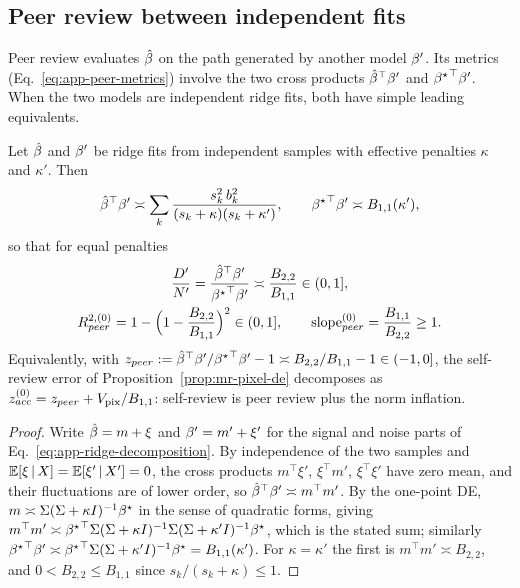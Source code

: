 \subsection{Peer review between independent fits}
\label{sec:app-peer-review}

Peer review evaluates $\hat{\beta}$ on the path generated by another model
${\beta^{\prime}}$.  Its metrics (Eq.~\ref{eq:app-peer-metrics}) involve the two
cross products ${\hat{\beta}}^\top{\beta^{\prime}}$ and ${{\beta^{\star}}}^\top{\beta^{\prime}}$.  When the
two models are independent ridge fits, both have simple leading
equivalents.

\begin{prop}
\label{prop:app-peer}
Let $\hat{\beta}$ and ${\beta^{\prime}}$ be ridge fits from independent samples with
effective penalties $\kappa$ and $\kappa'$.  Then
\begin{equation}
{\hat{\beta}}^\top{\beta^{\prime}}\asymp\sum_k\frac{s_k^2\,b_k^2}{(s_k+\kappa)(s_k+\kappa')},\qquad
{{\beta^{\star}}}^\top{\beta^{\prime}}\asymp B_{1,1}(\kappa'),
\end{equation}
so that for equal penalties
\begin{equation}
\begin{gathered}
\frac{D^\prime}{N^\prime}=\frac{{\hat{\beta}}^\top{\beta^{\prime}}}{{{\beta^{\star}}}^\top{\beta^{\prime}}}\asymp\frac{B_{2,2}}{B_{1,1}}\in(0,1],\\
R^{2,(0)}_{peer}=1-\Big(1-\frac{B_{2,2}}{B_{1,1}}\Big)^2\in(0,1],
\qquad
\mathrm{slope}^{(0)}_{peer}=\frac{B_{1,1}}{B_{2,2}}\ge1 .
\end{gathered}
\label{eq:app-peer-de}
\end{equation}
Equivalently, with $z_{peer}:={\hat{\beta}}^\top{\beta^{\prime}}/{{\beta^{\star}}}^\top{\beta^{\prime}}-1\asymp B_{2,2}/B_{1,1}-1\in(-1,0]$, the self-review error of Proposition~\ref{prop:mr-pixel-de} decomposes as $z^{(0)}_{acc}=z_{peer}+V_{\rm pix}/B_{1,1}$: self-review is peer review plus the norm inflation.
\end{prop}
\begin{proof}
Write $\hat{\beta}=m+\xi$ and ${\beta^{\prime}}=m'+\xi'$ for the signal and noise parts of
Eq.~\ref{eq:app-ridge-decomposition}.
By
independence of the two samples and $\mathbb{E}[\xi\,|\,X]=\mathbb{E}[\xi'\,|\,X']=0$, the cross
products $m^\top \xi'$, $\xi^\top m'$, $\xi^\top \xi'$ have zero mean, and their
fluctuations are of lower order, so ${\hat{\beta}}^\top{\beta^{\prime}}\asymp m^\top m'$.
By the one-point DE, $m\asymp\Sigma(\Sigma+\kappa I)^{-1}{\beta^{\star}}$ in the sense
of quadratic forms, giving
$m^\top m'\asymp{{\beta^{\star}}}^\top\Sigma(\Sigma+\kappa I)^{-1}\Sigma(\Sigma+\kappa'I)^{-1}{\beta^{\star}}$,
which is the stated sum; similarly ${{\beta^{\star}}}^\top{\beta^{\prime}}\asymp{{\beta^{\star}}}^\top\Sigma(\Sigma+\kappa'I)^{-1}{\beta^{\star}}=B_{1,1}(\kappa')$.
For $\kappa=\kappa'$ the first is $m^\top m'\asymp B_{2,2}$, and $0<B_{2,2}\le B_{1,1}$ since
$s_k/(s_k+\kappa)\le1$.
\end{proof}

